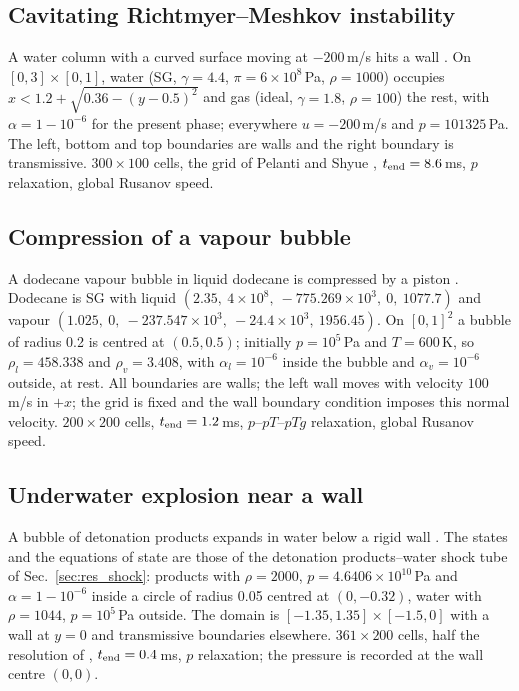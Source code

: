 \documentclass[a4paper,fleqn]{cas-sc}
\begin{document}
\subsection{Cavitating Richtmyer--Meshkov instability}
\label{sec:res_rm}
A water column with a curved surface moving at $-200$\,m/s hits a wall \cite[Sec.~4.7]{SPB2009}. On $[0,3]\times[0,1]$,
water (SG, $\gamma=4.4$, $\pi=6\times10^8$\,Pa, $\rho=1000$) occupies $x<1.2+\sqrt{0.36-(y-0.5)^2}$ and gas (ideal, $\gamma=1.8$,
$\rho=100$) the rest, with $\alpha=1-10^{-6}$ for the present phase; everywhere $u=-200$\,m/s and $p=101325$\,Pa. The left,
bottom and top boundaries are walls and the right boundary is transmissive. $300\times100$ cells, the grid of Pelanti and Shyue \cite[Sec.~5.3]{PelantiShyue2014}, $t_{\rm end}=8.6$\,ms,
$p$ relaxation, global Rusanov speed.

\subsection{Compression of a vapour bubble}
\label{sec:res_bubble}
A dodecane vapour bubble in liquid dodecane is compressed by a piston \cite[Sec.~5.4]{PelantiShyue2014}. Dodecane is SG
with liquid $(2.35,\ 4\times10^8,\ -775.269\times10^3,\ 0,\ 1077.7)$ and vapour $(1.025,\ 0,\ -237.547\times10^3,\ -24.4\times10^3,\ 1956.45)$. On $[0,1]^2$ a bubble of radius 0.2 is centred at $(0.5,0.5)$;
initially $p=10^5$\,Pa and $T=600$\,K, so $\rho_l=458.338$ and $\rho_v=3.408$, with $\alpha_l=10^{-6}$ inside the bubble and
$\alpha_v=10^{-6}$ outside, at rest. All boundaries are walls; the left wall moves with velocity $100$\,m/s in $+x$; the grid
is fixed and the wall boundary condition imposes this normal velocity. $200\times200$ cells, $t_{\rm end}=1.2$\,ms,
$p$--$pT$--$pTg$ relaxation, global Rusanov speed.

\subsection{Underwater explosion near a wall}
\label{sec:res_undex}
A bubble of detonation products expands in water below a rigid wall \cite[Sec.~8.1.2]{Pelanti2022}. The states and the
equations of state are those of the detonation products--water shock tube of Sec.~\ref{sec:res_shock}: products with
$\rho=2000$, $p=4.6406\times10^{10}$\,Pa and $\alpha=1-10^{-6}$ inside a circle of radius 0.05 centred at $(0,-0.32)$, water with
$\rho=1044$, $p=10^5$\,Pa outside. The domain is $[-1.35,1.35]\times[-1.5,0]$ with a wall at $y=0$ and transmissive
boundaries elsewhere. $361\times200$ cells, half the resolution of \cite{Pelanti2022}, $t_{\rm end}=0.4$\,ms, $p$ relaxation; the pressure is recorded at the wall
centre $(0,0)$.
\end{document}
